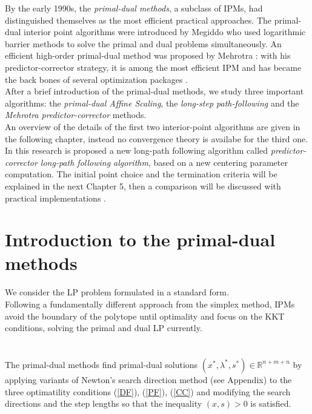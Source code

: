 \documentclass[a4paper,10 pt,titlepage,twoside]{book}
\theoremstyle{plain}
\theoremstyle{definition}
\theoremstyle{remark}
\begin{document}
By the early 1990s, the \textit{primal-dual methods}, a subclass of IPMs, had distinguished themselves as the most efficient practical approaches. The primal-dual interior point algorithms were introduced by Megiddo \cite{meg} who used logarithmic barrier methods to solve
the primal and dual problems simultaneously. An efficient
high-order primal-dual method was proposed by Mehrotra \cite{MER}: with his predictor-corrector
strategy, it is among the most efficient IPM and has became the back bones
of several optimization packages \cite{matlab}.\\ 
After a brief introduction of the primal-dual methods, we study three important algorithms: the \textit{primal-dual Affine Scaling}, the \textit{long-step path-following} and the \textit{Mehrotra predictor-corrector} methods.\\
An overview of the details of the first two interior-point algorithms are given in the following chapter, instead no convergence theory is availabe for the third one. \\
In this research is proposed a new long-path following algorithm called \textit{predictor-corrector long-path following algorithm}, based on a new centering parameter computation. The initial point choice and the
termination criteria will be explained in the next Chapter 5, then a comparison will be discussed with practical implementations .

\newpage
\section{Introduction to the primal-dual methods}
We consider the LP problem formulated in a standard form. \\
Following a fundamentally different approach from the simplex method, IPMs avoid the boundary of the polytope until optimality and focus on the KKT conditions, solving the primal and dual LP currently.\\
\\
\\
The primal-dual methods find primal-dual solutions $(x^{*},\lambda^{*},s^{*})\in\mathbb{R}^{n+m+n}$ by applying variants of Newton's search direction method (see Appendix) to the three optimatility conditions (\ref{DF}), (\ref{PF}), (\ref{CC}) and modifying the search directions and the step lengths so that the inequality $(x,s)>0$ is satisfied.\\
\end{document}
